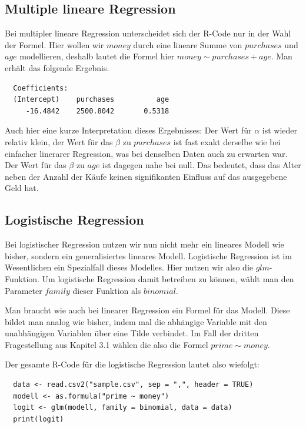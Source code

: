 \subsection{Multiple lineare Regression}

Bei multipler lineare Regression unterscheidet sich der R-Code nur in der Wahl der Formel. Hier wollen wir $money$ durch eine lineare Summe von $purchases$ und $age$ modellieren, deshalb lautet die Formel hier $money \sim purchases + age$. Man erhält das folgende Ergebnis.

\begin{lstlisting}
  Coefficients:
  (Intercept)    purchases          age
     -16.4842    2500.8042       0.5318
\end{lstlisting}

Auch hier eine kurze Interpretation dieses Ergebnisses: Der Wert für $\alpha$ ist wieder relativ klein, der Wert für das $\beta$ zu $purchases$ ist fast exakt derselbe wie bei einfacher linerarer Regression, was bei denselben Daten auch zu erwarten war. Der Wert für das $\beta$ zu $age$ ist dagegen nahe bei null. Das bedeutet, dass das Alter neben der Anzahl der Käufe keinen signifikanten Einfluss auf das ausgegebene Geld hat.

\subsection{Logistische Regression}

Bei logistischer Regression nutzen wir nun nicht mehr ein lineares Modell wie bisher, sondern ein generalisiertes lineares Modell. Logistische Regression ist im Wesentlichen ein Spezialfall dieses Modelles. Hier nutzen wir also die $glm$-Funktion. Um logistische Regression damit betreiben zu können, wählt man den Parameter $family$ dieser Funktion als $binomial$.

Man braucht wie auch bei linearer Regression ein Formel für das Modell. Diese bildet man analog wie bisher, indem mal die abhängige Variable mit den unabhängigen Variablen über eine Tilde verbindet. Im Fall der dritten Fragestellung aus Kapitel 3.1 wählen die also die Formel $prime \sim money$.

Der gesamte R-Code für die logistische Regression lautet also wiefolgt:

\begin{lstlisting}
  data <- read.csv2("sample.csv", sep = ",", header = TRUE)
  modell <- as.formula("prime ~ money")
  logit <- glm(modell, family = binomial, data = data)
  print(logit)
\end{lstlisting}

